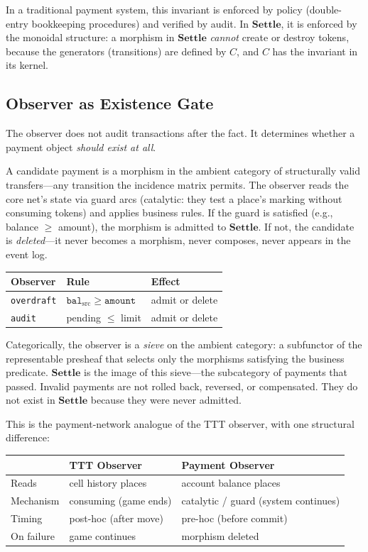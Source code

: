 \documentclass[11pt,a4paper]{article}
\newcommand{\Settle}{\mathbf{Settle}}
\begin{document}
In a traditional payment system, this invariant is enforced by policy (double-entry bookkeeping procedures) and verified by audit.
In $\Settle$, it is enforced by the monoidal structure: a morphism in $\Settle$ \emph{cannot} create or destroy tokens, because the generators (transitions) are defined by $C$, and $C$ has the invariant in its kernel.

\subsection{Observer as Existence Gate}

The observer does not audit transactions after the fact.
It determines whether a payment object \emph{should exist at all}.

A candidate payment is a morphism in the ambient category of structurally valid transfers---any transition the incidence matrix permits.
The observer reads the core net's state via guard arcs (catalytic: they test a place's marking without consuming tokens) and applies business rules.
If the guard is satisfied (e.g., balance $\geq$ amount), the morphism is admitted to $\Settle$.
If not, the candidate is \emph{deleted}---it never becomes a morphism, never composes, never appears in the event log.

\begin{center}
\begin{tabular}{@{}lll@{}}
\toprule
\textbf{Observer} & \textbf{Rule} & \textbf{Effect} \\
\midrule
\texttt{overdraft} & $\mathtt{bal}_{\mathrm{src}} \geq \mathtt{amount}$ & admit or delete \\
\texttt{audit} & pending $\leq$ limit & admit or delete \\
\bottomrule
\end{tabular}
\end{center}

Categorically, the observer is a \emph{sieve} on the ambient category: a subfunctor of the representable presheaf that selects only the morphisms satisfying the business predicate.
$\Settle$ is the image of this sieve---the subcategory of payments that passed.
Invalid payments are not rolled back, reversed, or compensated.
They do not exist in $\Settle$ because they were never admitted.

This is the payment-network analogue of the TTT observer, with one structural difference:

\begin{center}
\begin{tabular}{@{}lll@{}}
\toprule
& \textbf{TTT Observer} & \textbf{Payment Observer} \\
\midrule
Reads & cell history places & account balance places \\
Mechanism & consuming (game ends) & catalytic / guard (system continues) \\
Timing & post-hoc (after move) & pre-hoc (before commit) \\
On failure & game continues & morphism deleted \\
\bottomrule
\end{tabular}
\end{center}
\end{document}
